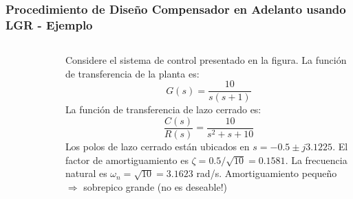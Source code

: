 \documentclass[aspectratio=169,handout]{beamer}
\theoremstyle{definition}
\theoremstyle{plain}
\theoremstyle{remark}
\begin{document}
\begin{frame}[c]\frametitle{Procedimiento de Diseño Compensador en Adelanto usando LGR - Ejemplo}
\vspace*{2mm}
\begin{columns}
	\begin{column}{0.3\textwidth}
	\begin{figure}
		\includegraphics[width=4cm]{images/ejemplo1_planta.eps}
	\end{figure}
	\end{column}
	\begin{column}{0.7\textwidth}
		Considere el sistema de control presentado en la figura. La función de transferencia de la planta es:
		\begin{equation*}
			G(s) = \frac{10}{s(s+1)}		
		\end{equation*}
		\pause
		La función de transferencia de lazo cerrado es:
		\begin{equation*}
			\frac{C(s)}{R(s)} = \frac{10}{s^2+s+10}
		\end{equation*}
		\pause
		Los polos de lazo cerrado están ubicados en $s = -0.5 \pm j3.1225$.
		El factor de amortiguamiento es $\zeta = 0.5/\sqrt{10} = 0.1581$.
		La frecuencia natural es $\omega_n = \sqrt{10} = 3.1623$ rad/s.
		Amortiguamiento pequeño $\Rightarrow$ sobrepico grande (no es deseable!)
	\end{column}
\end{columns}
\end{frame}
\end{document}

